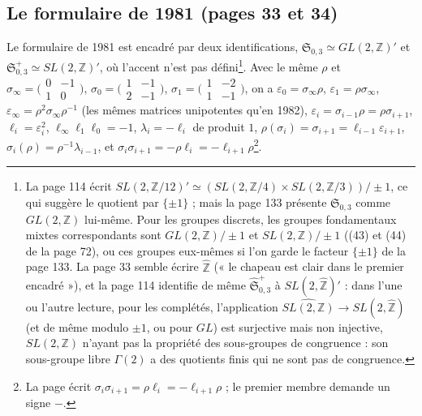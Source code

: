 \documentclass[11pt,a4paper]{article}
\begin{document}
\subsection*{Le formulaire de 1981 (pages 33 et 34)}

Le formulaire de 1981 est encadré par deux identifications,
$\mathfrak{S}_{0,3} \simeq GL(2, \mathbb{Z})'$ et
$\mathfrak{S}^{+}_{0,3} \simeq SL(2, \mathbb{Z})'$, où l'accent n'est pas défini\footnote{La page 114 écrit
$SL(2, \mathbb{Z}/12)' \simeq (SL(2, \mathbb{Z}/4) \times SL(2, \mathbb{Z}/3))/\pm 1$,
ce qui suggère le quotient par $\{\pm 1\}$ ; mais la page 133 présente
$\mathfrak{S}_{0,3}$ comme $GL(2, \mathbb{Z})$ lui-même. Pour les groupes
discrets, les groupes fondamentaux mixtes correspondants sont
$GL(2, \mathbb{Z})/\pm 1$ et $SL(2, \mathbb{Z})/\pm 1$ ((43) et (44) de la
page 72), ou ces groupes eux-mêmes si l'on garde le facteur $\{\pm 1\}$ de la
page 133. La page 33 semble écrire $\widehat{\mathbb{Z}}$ (« le chapeau est clair dans le premier
encadré »), et la page 114 identifie de même $\hat{\mathfrak{S}}^{+}_{0,3}$ à
$SL(2, \widehat{\mathbb{Z}})'$ : dans l'une ou l'autre lecture, pour les complétés, l'application
$\widehat{SL(2, \mathbb{Z})} \to SL(2, \widehat{\mathbb{Z}})$ (et de même modulo
$\pm 1$, ou pour $GL$) est surjective mais non injective, $SL(2, \mathbb{Z})$ n'ayant pas la propriété des
sous-groupes de congruence : son sous-groupe libre $\Gamma(2)$ a des quotients
finis qui ne sont pas de congruence.}. Avec le même $\rho$ et
$\sigma_\infty = \bigl(\begin{smallmatrix} 0 & -1 \\ 1 & 0 \end{smallmatrix}\bigr)$,
$\sigma_0 = \bigl(\begin{smallmatrix} 1 & -1 \\ 2 & -1 \end{smallmatrix}\bigr)$,
$\sigma_1 = \bigl(\begin{smallmatrix} 1 & -2 \\ 1 & -1 \end{smallmatrix}\bigr)$,
on a $\varepsilon_0 = \sigma_\infty\rho$, $\varepsilon_1 = \rho\sigma_\infty$,
$\varepsilon_\infty = \rho^2\sigma_\infty\rho^{-1}$ (les mêmes matrices
unipotentes qu'en 1982), $\varepsilon_i = \sigma_{i-1}\rho = \rho\sigma_{i+1}$,
$\ell_i = \varepsilon_i^2$, $\ell_\infty\ell_1\ell_0 = -1$, $\lambda_i = -\ell_i$
de produit $1$, $\rho(\sigma_i) = \sigma_{i+1} = \ell_{i-1}\varepsilon_{i+1}$,
$\sigma_i(\rho) = \rho^{-1}\lambda_{i-1}$, et
$\sigma_i\sigma_{i+1} = -\rho\ell_i = -\ell_{i+1}\rho$\footnote{La page écrit
$\sigma_i\sigma_{i+1} = \rho\ell_i = -\ell_{i+1}\rho$ ; le premier membre
demande un signe $-$.}.
\end{document}
